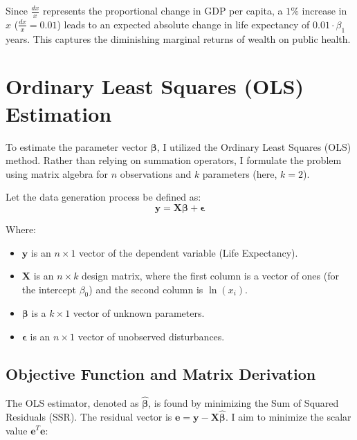 \documentclass[11pt, a4paper]{article}
\begin{document}
            Since $\frac{dx}{x}$ represents the proportional change in GDP per capita, a $1\%$ increase in $x$ ($\frac{dx}{x} = 0.01$) leads to an expected absolute change in life expectancy of $0.01 \cdot \beta_1$ years. This captures the diminishing marginal returns of wealth on public health.

            \section{Ordinary Least Squares (OLS) Estimation}

            To estimate the parameter vector $\boldsymbol{\beta}$, I utilized the Ordinary Least Squares (OLS) method. Rather than relying on summation operators, I formulate the problem using matrix algebra for $n$ observations and $k$ parameters (here, $k=2$).

            Let the data generation process be defined as:
            \begin{equation}
                \mathbf{y} = \mathbf{X}\boldsymbol{\beta} + \boldsymbol{\epsilon}
                \end{equation}

                Where:
                \begin{itemize}
                    \item $\mathbf{y}$ is an $n \times 1$ vector of the dependent variable (Life Expectancy).
                        \item $\mathbf{X}$ is an $n \times k$ design matrix, where the first column is a vector of ones (for the intercept $\beta_0$) and the second column is $\ln(x_i)$.
                            \item $\boldsymbol{\beta}$ is a $k \times 1$ vector of unknown parameters.
                                \item $\boldsymbol{\epsilon}$ is an $n \times 1$ vector of unobserved disturbances.
                                \end{itemize}

                                \subsection{Objective Function and Matrix Derivation}

                                The OLS estimator, denoted as $\hat{\boldsymbol{\beta}}$, is found by minimizing the Sum of Squared Residuals (SSR). The residual vector is $\mathbf{e} = \mathbf{y} - \mathbf{X}\hat{\boldsymbol{\beta}}$. I aim to minimize the scalar value $\mathbf{e}^T\mathbf{e}$:
\end{document}
